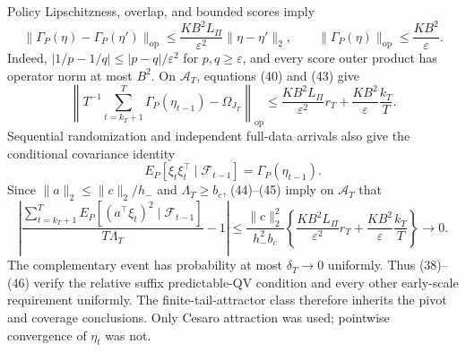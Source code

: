 Policy Lipschitzness, overlap, and bounded scores imply
\[
 \|\Gamma_P(\eta)-\Gamma_P(\eta')\|_{\mathrm{op}}
 \le\frac{KB^2L_\Pi}{\varepsilon^2}\|\eta-\eta'\|_2,
 \qquad
 \|\Gamma_P(\eta)\|_{\mathrm{op}}\le\frac{KB^2}{\varepsilon}.
\tag{43}
\]
Indeed, \(|1/p-1/q|\le|p-q|/\varepsilon^2\) for \(p,q\ge\varepsilon\),
and every score outer product has operator norm at most \(B^2\).  On
\(\mathcal A_T\), equations (40) and (43) give
\[
 \left\|T^{-1}\sum_{t=k_T+1}^T\Gamma_P(\eta_{t-1})-\Omega_{J_T}\right\|_{\mathrm{op}}
 \le \frac{KB^2L_\Pi}{\varepsilon^2}r_T
 +\frac{KB^2}{\varepsilon}\frac{k_T}{T}.
\tag{44}
\]
Sequential randomization and independent full-data arrivals also give the
conditional covariance identity
\[
 E_P[\xi_t\xi_t^\top\mid\mathcal F_{t-1}]
 =\Gamma_P(\eta_{t-1}).
\tag{45}
\]
Since \(\|a\|_2\le\|c\|_2/h_-\) and \(\Lambda_T\ge b_c\), (44)--(45) imply
on \(\mathcal A_T\) that
\[
 \left|
 \frac{\sum_{t=k_T+1}^TE_P[(a^\top\xi_t)^2\mid\mathcal F_{t-1}]}
 {T\Lambda_T}-1
 \right|
 \le
 \frac{\|c\|_2^2}{h_-^2b_c}
 \left\{
 \frac{KB^2L_\Pi}{\varepsilon^2}r_T
 +\frac{KB^2}{\varepsilon}\frac{k_T}{T}
 \right\}\longrightarrow0.
\tag{46}
\]
The complementary event has probability at most \(\delta_T\to0\) uniformly.
Thus (38)--(46) verify the relative suffix predictable-QV condition and every
other early-scale requirement uniformly.  The finite-tail-attractor class
therefore inherits the pivot and coverage conclusions.  Only Cesaro
attraction was used; pointwise convergence of \(\eta_t\) was not.
